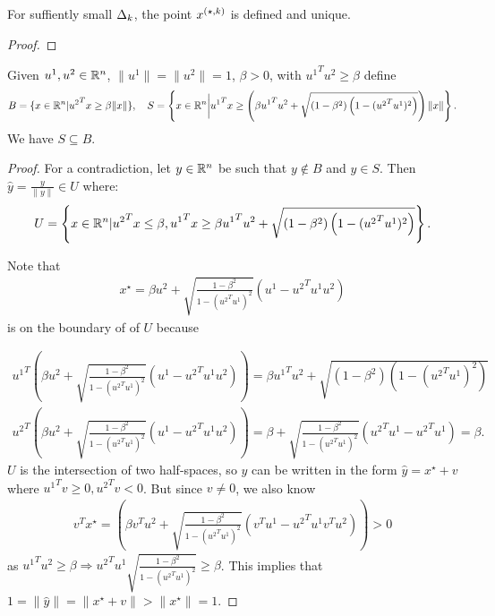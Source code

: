 \begin{theorem}
For suffiently small $\Delta_k$, the point ${x^{(\star, k)}}$ is defined and unique.
\end{theorem}

\begin{proof}
\end{proof}




\begin{theorem}
\label{cone_subset_cone}
Given $u^1, u^2 \in {\mathbb R^{n}}$, $\|u^1\| = \|u^2\|= 1$, $\beta >0$, with ${u^1}^Tu^2 \ge \beta$ define
\begin{align*}
B = \{x\in{\mathbb R^{n}} | {u^2}^Tx \ge \beta\|x\|\}, \quad
S = \left\{x\in{\mathbb R^{n}} \bigg| {u^1}^Tx \ge \left(\beta {u^1}^Tu^2 + \sqrt{(1 - \beta^2)\left(1 - ({u^2}^Tu^1)^2\right)}\right)\|x\| \right\}. 
\end{align*}
We have $S \subseteq B$.
\end{theorem}


\begin{proof}
For a contradiction, let $y \in {\mathbb R^{n}}$ be such that $y \not \in B$ and $y \in S$.
Then $\hat y = \frac{y}{\|y\|} \in U$ where:
\begin{align*}
U = \left\{x \in {\mathbb R^{n}} | {u^2}^Tx \le \beta, {u^1}^Tx \ge \beta {u^1}^Tu^2 + \sqrt{(1 - \beta^2)\left(1 - ({u^2}^Tu^1)^2\right)} \right\}.
\end{align*}

Note that
\begin{align*}
x^{\star} = \beta u^2 + \sqrt{\frac{1 - \beta^2}{1 - ({u^2}^Tu^1)^2}} (u^1 - {u^2}^Tu^1 u^2 )
\end{align*}
is on the boundary of of $U$ because

\begin{align*}
{u^1}^T\left(\beta u^2 + \sqrt{\frac{1 - \beta^2}{1 - ({u^2}^Tu^1)^2}} (u^1 - {u^2}^Tu^1 u^2 )\right) = 
\beta {u^1}^Tu^2 + \sqrt{(1 - \beta^2)\left(1 - ({u^2}^Tu^1)^2\right)} \\
{u^2}^T\left(\beta u^2 + \sqrt{\frac{1 - \beta^2}{1 - ({u^2}^Tu^1)^2}} (u^1 - {u^2}^Tu^1 u^2 )\right) = 
\beta + \sqrt{\frac{1 - \beta^2}{1 - ({u^2}^Tu^1)^2}} ({u^2}^Tu^1 - {u^2}^Tu^1 ) = \beta.
\end{align*}
$U$ is the intersection of two half-spaces, so $\hat y$ can be written in the form $\hat y = x^{\star} + v$ where ${u^1}^Tv \ge 0, {u^2}^Tv < 0$.
But since $v \ne 0$, we also know
\begin{align*}
{v}^Tx^{\star} = 
\left(\beta {v}^Tu^2 + \sqrt{\frac{1 - \beta^2}{1 - ({u^2}^Tu^1)^2}} ({v}^Tu^1 - {u^2}^Tu^1 {v}^Tu^2 )\right) > 0
\end{align*}
as ${u^1}^Tu^2 \ge \beta \Longrightarrow {u^2}^Tu^1\sqrt{\frac{1 - \beta^2}{1 - ({u^2}^Tu^1)^2}} \ge \beta$.
This implies that $1 = \|\hat y\| = \|x^{\star} + v\| > \|x^{\star}\| = 1$.
\end{proof}






